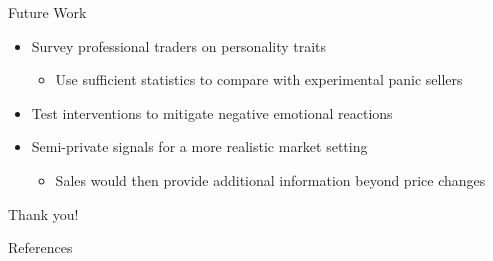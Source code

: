 \documentclass{beamer}
\begin{document}
\begin{frame}{Future Work}
\begin{itemize}
    \item Survey professional traders on personality traits
    \begin{itemize}
        \item Use sufficient statistics to compare with experimental panic sellers
    \end{itemize}
    \item Test interventions to mitigate negative emotional reactions
    \item Semi-private signals for a more realistic market setting
    \begin{itemize}
        \item Sales would then provide additional information beyond price changes
    \end{itemize}
\end{itemize}

\vspace{1cm}
\centering
\Large Thank you!
\end{frame}


\begin{frame}[allowframebreaks]{References}

\scriptsize

\end{frame}
\end{document}
